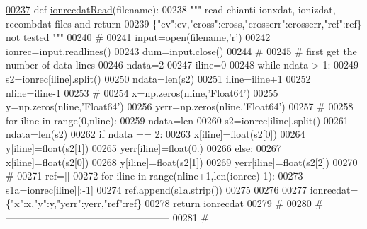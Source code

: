 \begin{DoxyCode}
\hypertarget{namespacepyneb_1_1utils_1_1__chianti__tools_l00237}{}\hyperlink{namespacepyneb_1_1utils_1_1__chianti__tools_a552566dde90c6b3d2d8e934914d3ae76}{00237} \textcolor{keyword}{def }\hyperlink{namespacepyneb_1_1utils_1_1__chianti__tools_a552566dde90c6b3d2d8e934914d3ae76}{ionrecdatRead}(filename):
00238     \textcolor{stringliteral}{""" read chianti ionxdat, ionizdat, recombdat files and return}
00239 \textcolor{stringliteral}{    \{"ev":ev,"cross":cross,"crosserr":crosserr,"ref":ref\}  not tested """}
00240     \textcolor{comment}{#}
00241     input=open(filename,\textcolor{stringliteral}{'}\textcolor{stringliteral}{r')}
00242 \textcolor{stringliteral}{    ionrec=input.readlines()}
00243 \textcolor{stringliteral}{    dum=input.close()}
00244 \textcolor{stringliteral}{    }\textcolor{comment}{#}
00245     \textcolor{comment}{# first get the number of data lines}
00246     ndata=2
00247     iline=0
00248     \textcolor{keywordflow}{while} ndata > 1:
00249         s2=ionrec[iline].split()
00250         ndata=len(s2)
00251         iline=iline+1
00252     nline=iline-1
00253     \textcolor{comment}{#}
00254     x=np.zeros(nline,\textcolor{stringliteral}{'Float64'})
00255     y=np.zeros(nline,\textcolor{stringliteral}{'Float64'})
00256     yerr=np.zeros(nline,\textcolor{stringliteral}{'Float64'})
00257 \textcolor{comment}{#}
00258     \textcolor{keywordflow}{for} iline \textcolor{keywordflow}{in} range(0,nline):
00259         ndata=len
00260         s2=ionrec[iline].split()
00261         ndata=len(s2)
00262         \textcolor{keywordflow}{if} ndata == 2:
00263             x[iline]=float(s2[0])
00264             y[iline]=float(s2[1])
00265             yerr[iline]=float(0.)
00266         \textcolor{keywordflow}{else}:
00267             x[iline]=float(s2[0])
00268             y[iline]=float(s2[1])
00269             yerr[iline]=float(s2[2])
00270     \textcolor{comment}{#}
00271     ref=[]
00272     \textcolor{keywordflow}{for} iline \textcolor{keywordflow}{in} range(nline+1,len(ionrec)-1):
00273         s1a=ionrec[iline][:-1]
00274         ref.append(s1a.strip())
00275 
00276 
00277     ionrecdat=\{\textcolor{stringliteral}{"x"}:x,\textcolor{stringliteral}{"y"}:y,\textcolor{stringliteral}{"yerr"}:yerr,\textcolor{stringliteral}{"ref"}:ref\}
00278     \textcolor{keywordflow}{return} ionrecdat
00279     \textcolor{comment}{#}
00280     \textcolor{comment}{# --------------------------------------------------}
00281     \textcolor{comment}{#}
\end{DoxyCode}
\hypertarget{namespacepyneb_1_1utils_1_1__chianti__tools_addc139edf6069387aed0049344002b13}{}
